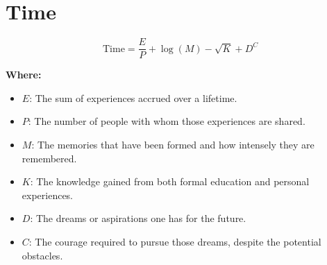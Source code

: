 \chapter{Time}

\begin{equation}
\text{Time} = \frac{E}{P} + \log{(M)} - \sqrt{K} + D^C
\end{equation}

\textbf{Where:}

\begin{itemize}
    \item $E$: The sum of experiences accrued over a lifetime.
    \item $P$: The number of people with whom those experiences are shared.
    \item $M$: The memories that have been formed and how intensely they are remembered.
    \item $K$: The knowledge gained from both formal education and personal experiences.
    \item $D$: The dreams or aspirations one has for the future.
    \item $C$: The courage required to pursue those dreams, despite the potential obstacles.
\end{itemize}